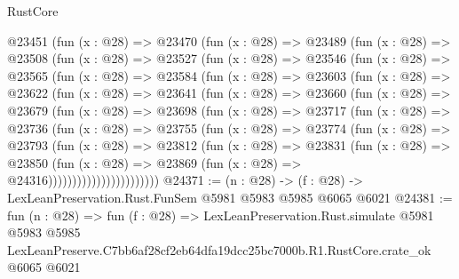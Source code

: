 \begin{lexlean}{RustCore}
\begin{coremodule}
  @23451
    (fun (x : @28) =>
    @23470
      (fun (x : @28) =>
      @23489
        (fun (x : @28) =>
        @23508
          (fun (x : @28) =>
          @23527
            (fun (x : @28) =>
            @23546
              (fun (x : @28) =>
              @23565
                (fun (x : @28) =>
                @23584
                  (fun (x : @28) =>
                  @23603
                    (fun (x : @28) =>
                    @23622
                      (fun (x : @28) =>
                      @23641
                        (fun (x : @28) =>
                        @23660
                          (fun (x : @28) =>
                          @23679
                            (fun (x : @28) =>
                            @23698
                              (fun (x : @28) =>
                              @23717
                                (fun (x : @28) =>
                                @23736
                                  (fun (x : @28) =>
                                  @23755
                                    (fun (x : @28) =>
                                    @23774
                                      (fun (x : @28) =>
                                      @23793
                                        (fun (x : @28) =>
                                        @23812
                                          (fun (x : @28) =>
                                          @23831
                                            (fun (x : @28) =>
                                            @23850
                                              (fun (x : @28) =>
                                              @23869 (fun (x : @28) => @24316)))))))))))))))))))))))
@24371 := (n : @28) -> (f : @28) -> LexLeanPreservation.Rust.FunSem @5981 @5983 @5985 @6065 @6021
@24381 := fun (n : @28) =>
  fun (f : @28) =>
  LexLeanPreservation.Rust.simulate
    @5981
    @5983
    @5985
    LexLeanPreserve.C7bb6af28cf2eb64dfa19dcc25bc7000b.R1.RustCore.crate_ok
    @6065
    @6021
\end{coremodule}
\end{lexlean}
